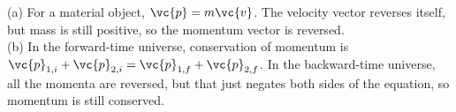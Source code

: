 (a) For a material object, $\vc{p}=m\vc{v}$. The velocity vector reverses
itself, but mass is still positive, so the momentum vector is reversed.\\
(b) In the forward-time universe, conservation of momentum is
$\vc{p}_{1,i}+\vc{p}_{2,i}=\vc{p}_{1,f}+\vc{p}_{2,f}$. In the backward-time
universe, all the momenta are reversed, but that just negates both sides
of the equation, so momentum is still conserved.
